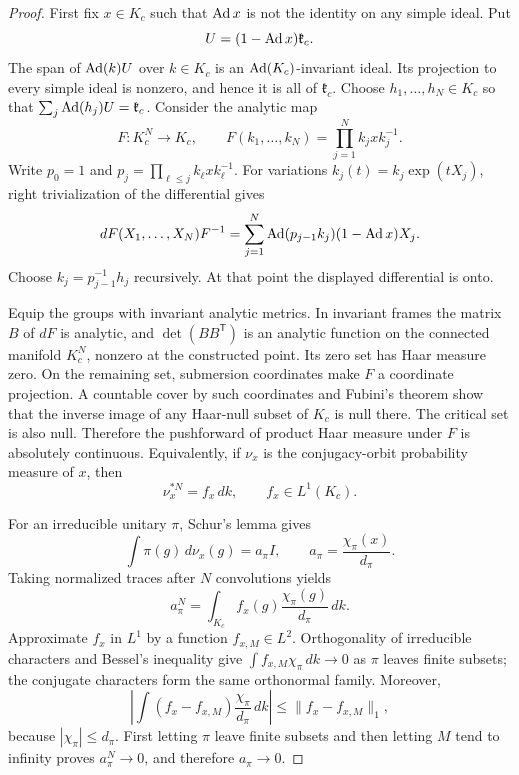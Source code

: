 \begin{proof}
First fix $x\in K_c$ such that $\operatorname{Ad} x$ is not the identity on
any simple ideal. Put
\[
 U=(1-\operatorname{Ad} x)\mathfrak k_c.
\]
The span of $\operatorname{Ad}(k)U$ over $k\in K_c$ is an
$\operatorname{Ad}(K_c)$-invariant ideal. Its projection to every simple
ideal is nonzero, and hence it is all of $\mathfrak k_c$.
Choose $h_1,\ldots,h_N\in K_c$ so that
$\sum_j\operatorname{Ad}(h_j)U=\mathfrak k_c$. Consider the analytic map
\[
 F:K_c^N\longrightarrow K_c,
 \qquad F(k_1,\ldots,k_N)=\prod_{j=1}^N k_jxk_j^{-1}.
\]
Write $p_0=1$ and
$p_j=\prod_{\ell\leq j}k_\ell xk_\ell^{-1}$.
For variations $k_j(t)=k_j\exp(tX_j)$, right trivialization
of the differential gives
\[
 dF(X_1,\ldots,X_N)F^{-1}
 =\sum_{j=1}^N
   \operatorname{Ad}(p_{j-1}k_j)(1-\operatorname{Ad} x)X_j.
\]
Choose $k_j=p_{j-1}^{-1}h_j$ recursively. At that point the
displayed differential is onto.

Equip the groups with invariant analytic metrics. In invariant
frames the matrix $B$ of $dF$ is analytic, and
$\det(BB^{\mathsf T})$ is an analytic function on the connected
manifold $K_c^N$, nonzero at the constructed point. Its zero
set has Haar measure zero. On the remaining set, submersion
coordinates make $F$ a coordinate projection. A countable
cover by such coordinates and Fubini's theorem show that the
inverse image of any Haar-null subset of $K_c$ is null there.
The critical set is also null. Therefore the pushforward of
product Haar measure under $F$ is absolutely continuous.
Equivalently, if $\nu_x$ is the conjugacy-orbit probability
measure of $x$, then
\[
 \nu_x^{*N}=f_x\,dk,\qquad f_x\in L^1(K_c).
\]

For an irreducible unitary $\pi$, Schur's lemma gives
\[
 \int\pi(g)\,d\nu_x(g)
 =a_\pi I,\qquad a_\pi=\frac{\chi_\pi(x)}{d_\pi}.
\]
Taking normalized traces after $N$ convolutions yields
\[
 a_\pi^N=\int_{K_c}f_x(g)
                    \frac{\chi_\pi(g)}{d_\pi}\,dk.
\]
Approximate $f_x$ in $L^1$ by a function $f_{x,M}\in L^2$.
Orthogonality of irreducible characters and Bessel's inequality
give $\int f_{x,M}\chi_\pi\,dk\to0$ as $\pi$ leaves
finite subsets; the conjugate characters form the same
orthonormal family. Moreover,
\[
 \left|\int(f_x-f_{x,M})\frac{\chi_\pi}{d_\pi}\,dk\right|
 \leq\|f_x-f_{x,M}\|_1,
\]
because $|\chi_\pi|\leq d_\pi$. First letting $\pi$ leave
finite subsets and then letting $M$ tend to infinity proves
$a_\pi^N\to0$, and therefore $a_\pi\to0$.


\end{proof}
